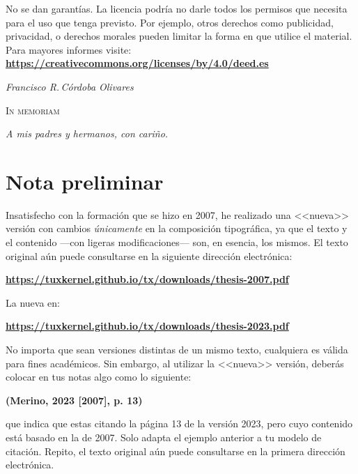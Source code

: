 \documentclass[14pt,twoside,final]{extbook} %
\begin{document}
\begin{scriptsize}
\begin{flushleft}
\begin{minipage}{7.5cm}
\noindent No se dan garantías. La licencia podría no darle todos los permisos que necesita para el uso que tenga previsto. Por ejemplo, otros derechos como publicidad, privacidad, o derechos morales pueden limitar la forma en que utilice el material. \\

\noindent Para mayores informes visite: \\ 

\textbf{\url{https://creativecommons.org/licenses/by/4.0/deed.es}}
\end{minipage}
\end{flushleft}
\end{scriptsize}
\newpage
\pagestyle{empty}
\vspace*{42pt}
\begin{flushright}
\textit{Francisco R.\,Córdoba Olivares}
\end{flushright}
\begin{flushright}
\textsc{In memoriam}
\vspace*{28pt}
\end{flushright}
\begin{flushright}
\textit{A mis padres y hermanos, con cariño.}
\end{flushright}
\newpage
\pagestyle{empty}
\newpage
\pagestyle{empty}
\chapter*{Nota preliminar}\label{ch:nota-preliminar}
Insatisfecho con la formación que se hizo en 2007, he realizado una <<nueva>> versión con cambios \emph{únicamente} en la composición tipográfica, ya que el texto y el contenido ---con ligeras modificaciones--- son, en esencia, los mismos. El texto original aún puede consultarse en la siguiente dirección electrónica:
\begin{center}
\href{https://tuxkernel.github.io/tx/downloads/thesis-2007.pdf}{\bfseries https://tuxkernel.github.io/tx/downloads/thesis-2007.pdf}
\end{center}
La nueva en:
\begin{center}
\href{https://tuxkernel.github.io/tx/downloads/thesis-2023.pdf}{\bfseries https://tuxkernel.github.io/tx/downloads/thesis-2023.pdf}
\end{center}
No importa que sean versiones distintas de un mismo texto, cualquiera es válida para fines académicos. Sin embargo, al utilizar la <<nueva>> versión, deberás colocar en tus notas algo como lo siguiente:
\begin{center}
\bfseries (Merino, 2023 [2007], p. 13)
\end{center}
\noindent que indica que estas citando la página 13 de la versión 2023, pero cuyo contenido está basado en la de 2007. Solo adapta el ejemplo anterior a tu modelo de citación. Repito, el texto original aún puede consultarse en la primera dirección electrónica.
\end{document}
